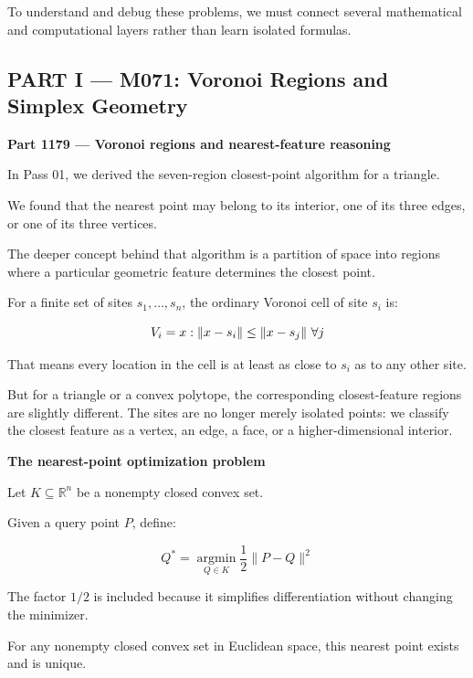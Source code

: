 To understand and debug these problems, we must connect several mathematical and computational layers rather than learn isolated formulas.

\subsection{PART I --- M071: Voronoi Regions and Simplex Geometry}\label{04-visual-computing-ii-ch022-part-i-m071-voronoi-regions-and-simplex-geometry}

\hypertarget{04-visual-computing-ii-ch022-part-i-m071-voronoi-regions-and-simplex-geometry}{}

\textbf{Part 1179 --- Voronoi regions and nearest-feature reasoning}

In Pass 01, we derived the seven-region closest-point algorithm for a triangle.

We found that the nearest point may belong to its interior, one of its three edges, or one of its three vertices.

The deeper concept behind that algorithm is a partition of space into regions where a particular geometric feature determines the closest point.

For a finite set of sites \(s_1,\ldots,s_n\), the ordinary Voronoi cell of site \(s_i\) is:

\[
V_i=\\{x:\|x-s_i\|\le\|x-s_j\|\ \forall j\\}
\]

That means every location in the cell is at least as close to \(s_i\) as to any other site.

But for a triangle or a convex polytope, the corresponding closest-feature regions are slightly different. The sites are no longer merely isolated points: we classify the closest feature as a vertex, an edge, a face, or a higher-dimensional interior.

\textbf{The nearest-point optimization problem}

Let \(K\subseteq\mathbb R^n\) be a nonempty closed convex set.

Given a query point \(P\), define:

\[
\boxed{ Q^*=\underset{Q\in K}{\operatorname{argmin}}\frac12\|P-Q\|^2 }
\]

The factor \(1/2\) is included because it simplifies differentiation without changing the minimizer.

For any nonempty closed convex set in Euclidean space, this nearest point exists and is unique.

